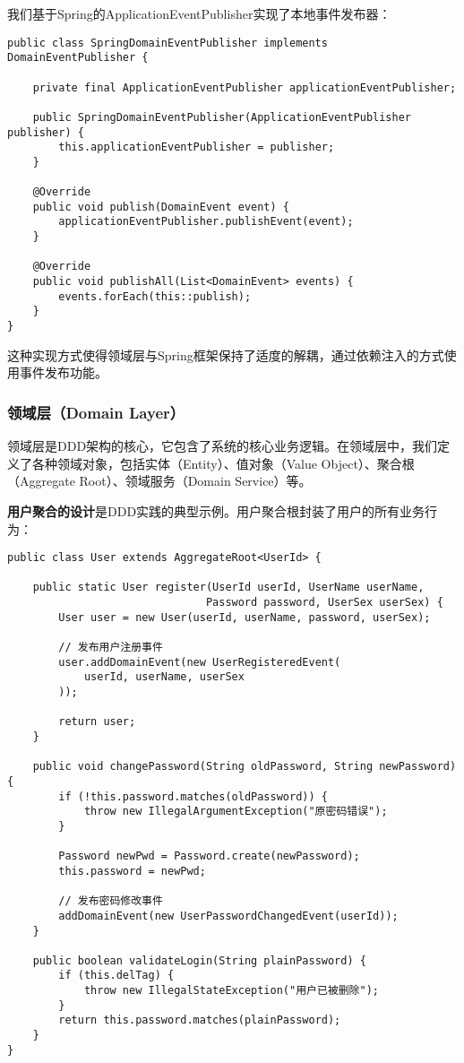 \documentclass[a4paper,12pt]{article}
\begin{document}
我们基于Spring的ApplicationEventPublisher实现了本地事件发布器：

\begin{lstlisting}[caption=Spring事件发布器实现]
public class SpringDomainEventPublisher implements DomainEventPublisher {
    
    private final ApplicationEventPublisher applicationEventPublisher;
    
    public SpringDomainEventPublisher(ApplicationEventPublisher publisher) {
        this.applicationEventPublisher = publisher;
    }
    
    @Override
    public void publish(DomainEvent event) {
        applicationEventPublisher.publishEvent(event);
    }
    
    @Override
    public void publishAll(List<DomainEvent> events) {
        events.forEach(this::publish);
    }
}
\end{lstlisting}

这种实现方式使得领域层与Spring框架保持了适度的解耦，通过依赖注入的方式使用事件发布功能。

\subsubsection{领域层（Domain Layer）}

领域层是DDD架构的核心，它包含了系统的核心业务逻辑。在领域层中，我们定义了各种领域对象，包括实体（Entity）、值对象（Value Object）、聚合根（Aggregate Root）、领域服务（Domain Service）等。

\textbf{用户聚合的设计}是DDD实践的典型示例。用户聚合根封装了用户的所有业务行为：

\begin{lstlisting}[caption=User聚合根关键方法]
public class User extends AggregateRoot<UserId> {
    
    public static User register(UserId userId, UserName userName, 
                               Password password, UserSex userSex) {
        User user = new User(userId, userName, password, userSex);
        
        // 发布用户注册事件
        user.addDomainEvent(new UserRegisteredEvent(
            userId, userName, userSex
        ));
        
        return user;
    }
    
    public void changePassword(String oldPassword, String newPassword) {
        if (!this.password.matches(oldPassword)) {
            throw new IllegalArgumentException("原密码错误");
        }
        
        Password newPwd = Password.create(newPassword);
        this.password = newPwd;
        
        // 发布密码修改事件
        addDomainEvent(new UserPasswordChangedEvent(userId));
    }
    
    public boolean validateLogin(String plainPassword) {
        if (this.delTag) {
            throw new IllegalStateException("用户已被删除");
        }
        return this.password.matches(plainPassword);
    }
}
\end{lstlisting}
\end{document}
